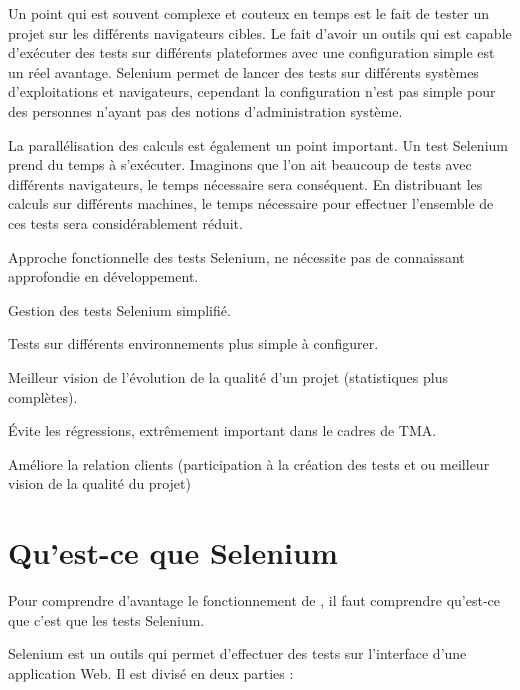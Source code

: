Un point qui est souvent complexe et couteux en temps est le fait de tester un projet 
sur les différents navigateurs cibles.  Le fait d'avoir un outils qui est capable d'exécuter
des tests sur différents plateformes avec une configuration simple est un réel avantage.
Selenium permet de lancer des tests sur différents systèmes d'exploitations et navigateurs, 
cependant la configuration n'est pas simple pour des personnes n'ayant pas des notions 
d'administration système. 

La parallélisation des calculs est également un point important.  Un test Selenium prend du 
temps à s'exécuter. Imaginons que l'on ait  beaucoup de tests avec différents navigateurs, le
temps nécessaire sera conséquent. En distribuant les calculs sur différents machines, le temps
nécessaire pour effectuer l'ensemble de ces tests sera considérablement réduit. 

\begin{description}
	\item \positif{}
	  Approche fonctionnelle des tests Selenium, ne nécessite pas de connaissant approfondie en développement.
	\item \positif{}  Gestion des tests Selenium simplifié.
	\item \positif{}  Tests sur différents environnements plus simple à configurer.
	\item \positif{}  Meilleur vision de l'évolution de la qualité d'un projet (statistiques plus complètes).
	\item \positif{}  Évite les régressions, extrêmement important dans le cadres de TMA.
	\item \positif{}  Améliore la relation clients (participation à la création des tests et ou meilleur vision de la qualité du projet)
\end{description}


\section{Qu'est-ce que Selenium}
Pour comprendre d'avantage le fonctionnement de \youTestIt{}, il faut comprendre qu'est-ce que
c'est que les tests Selenium.

Selenium est un outils qui permet d'effectuer des tests sur l'interface d'une application Web. Il 
est divisé en deux parties :

